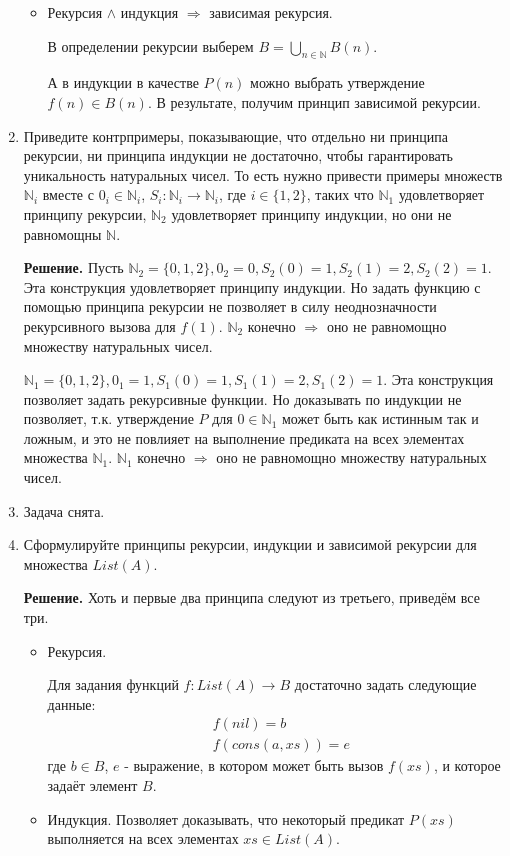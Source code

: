\begin{enumerate}
\begin{itemize}
	\item Рекурсия $\wedge$ индукция $\Rightarrow$ зависимая рекурсия.
	
	В определении рекурсии выберем $B = \bigcup\limits_{n\in \mathbb{N}} B(n)$.
	
	А в индукции в качестве $P(n)$ можно выбрать утверждение $f(n) \in B(n)$. В результате, получим принцип 
	зависимой рекурсии.
\end{itemize}

\item Приведите контрпримеры, показывающие, что отдельно ни принципа рекурсии, ни принципа индукции не 
достаточно, чтобы гарантировать уникальность натуральных чисел. То есть нужно привести примеры множеств 
$\mathbb{N}_i$ вместе с $0_i \in \mathbb{N}_i$, $S_i : \mathbb{N}_i \to \mathbb{N}_i$, где $i \in \{ 1, 2 
\}$, таких что $\mathbb{N}_1$ удовлетворяет принципу рекурсии, $\mathbb{N}_2$ удовлетворяет принципу 
индукции, но они не равномощны $\mathbb{N}$.
    
\textbf{Решение.} Пусть $\mathbb{N}_2 = \{0,1,2\}, 0_2 = 0, S_2(0) = 1, S_2(1) = 2, S_2(2) = 1$. Эта 
конструкция удовлетворяет принципу индукции. Но задать функцию с помощью принципа рекурсии не позволяет в 
силу неоднозначности рекурсивного вызова для $f(1)$. $\mathbb{N}_2$ конечно $\Rightarrow$ оно не равномощно 
множеству натуральных чисел. 

$\mathbb{N}_1 = \{0,1,2\}, 0_1 = 1, S_1(0) = 1, S_1(1) = 2, S_1(2) = 1$. Эта конструкция позволяет задать 
рекурсивные функции. Но доказывать по индукции не позволяет, т.к. утверждение $P$ для $0\in \mathbb{N}_1$ 
может быть как истинным так и ложным, и это не повлияет на выполнение предиката на всех элементах множества 
$\mathbb{N}_1$. $\mathbb{N}_1$ конечно $\Rightarrow$ оно не равномощно множеству натуральных чисел. 

\item Задача снята.

\item Сформулируйте принципы рекурсии, индукции и зависимой рекурсии для множества $List(A)$.

\textbf{Решение.} Хоть и первые два принципа следуют из третьего, приведём все три.

\begin{itemize}
	\item Рекурсия.
	
	Для задания функций $f:List(A) \rightarrow B$ достаточно задать следующие данные:
	\begin{align*}
		&f(nil) = b \\
		&f(cons(a, xs))= e 
	\end{align*}
	где $b \in B$, $e$ - выражение, в котором может быть вызов $f(xs)$, и которое задаёт элемент $B$.
	\item Индукция. Позволяет доказывать, что некоторый предикат $P(xs)$ выполняется на всех элементах $xs 
	\in List(A)$.
	

\end{itemize}
\end{enumerate}
